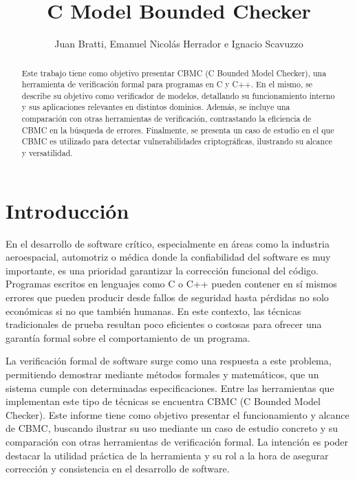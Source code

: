 \documentclass[runningheads]{llncs}
\begin{document}
\title{C Model Bounded Checker}

\author{
  Juan Bratti,
  Emanuel Nicolás Herrador e
  Ignacio Scavuzzo
}


\maketitle

\begin{abstract}
  Este trabajo tiene como objetivo presentar CBMC (C Bounded Model Checker), una herramienta de verificación formal para programas en C y C++.
  En el mismo, se describe su objetivo como verificador de modelos, detallando su funcionamiento interno y sus aplicaciones relevantes en distintos dominios.
  Además, se incluye una comparación con otras herramientas de verificación, contrastando la eficiencia de CBMC en la búsqueda de errores.
  Finalmente, se presenta un caso de estudio en el que CBMC es utilizado para detectar vulnerabilidades criptográficas, ilustrando su alcance y versatilidad.
\end{abstract}

\section{Introducción}
En el desarrollo de software crítico, especialmente en áreas como la industria aeroespacial, automotriz o médica donde la confiabilidad del software es muy importante, es una prioridad garantizar la corrección funcional del código.
Programas escritos en lenguajes como C o C++ pueden contener en sí mismos errores que pueden producir desde fallos de seguridad hasta pérdidas no solo económicas si no que también humanas.
En este contexto, las técnicas tradicionales de prueba resultan poco eficientes o costosas para ofrecer una garantía formal sobre el comportamiento de un programa.

La verificación formal de software surge como una respuesta a este problema, permitiendo demostrar mediante métodos formales y matemáticos, que un sistema cumple con determinadas especificaciones.
Entre las herramientas que implementan este tipo de técnicas se encuentra CBMC (C Bounded Model Checker).
Este informe tiene como objetivo presentar el funcionamiento y alcance de CBMC, buscando ilustrar su uso mediante un caso de estudio concreto y su comparación con otras herramientas de verificación formal.
La intención es poder destacar la utilidad práctica de la herramienta y su rol a la hora de asegurar corrección y consistencia en el desarrollo de software.
\end{document}
